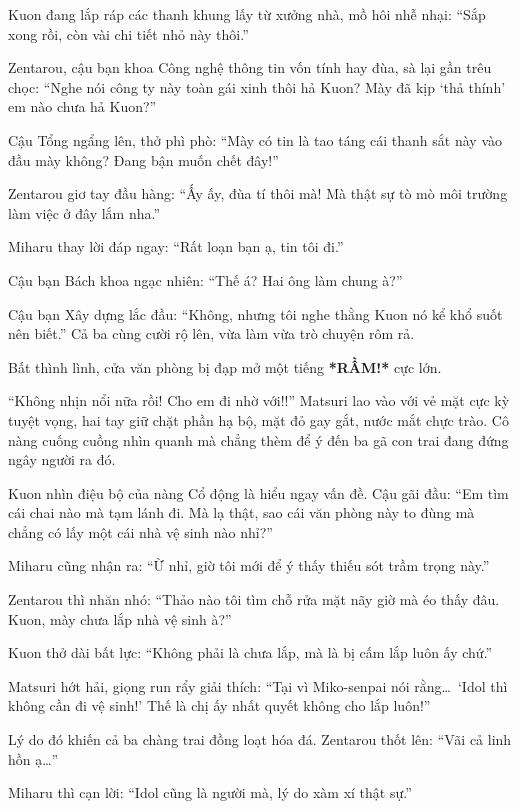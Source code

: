 \documentclass[../main.tex]{subfiles}
\begin{document}
Kuon đang lắp ráp các thanh khung lấy từ xưởng nhà, mồ hôi nhễ nhại: ``Sắp xong rồi, còn vài chi tiết nhỏ này thôi.''

Zentarou, cậu bạn khoa Công nghệ thông tin vốn tính hay đùa, sà lại gần trêu chọc: ``Nghe nói công ty này toàn gái xinh thôi hả Kuon? Mày đã kịp `thả thính' em nào chưa hả Kuon?''

Cậu Tổng ngẩng lên, thở phì phò: ``Mày có tin là tao táng cái thanh sắt này vào đầu mày không? Đang bận muốn chết đây!''

Zentarou giơ tay đầu hàng: ``Ấy ấy, đùa tí thôi mà! Mà thật sự tò mò môi trường làm việc ở đây lắm nha.''

Miharu thay lời đáp ngay: ``Rất loạn bạn ạ, tin tôi đi.''

Cậu bạn Bách khoa ngạc nhiên: ``Thế á? Hai ông làm chung à?''

Cậu bạn Xây dựng lắc đầu: ``Không, nhưng tôi nghe thằng Kuon nó kể khổ suốt nên biết.'' Cả ba cùng cười rộ lên, vừa làm vừa trò chuyện rôm rả.

Bất thình lình, cửa văn phòng bị đạp mở một tiếng \textbf{*RẦM!*} cực lớn.


``Không nhịn nổi nữa rồi! Cho em đi nhờ với!!'' Matsuri lao vào với vẻ mặt cực kỳ tuyệt vọng, hai tay giữ chặt phần hạ bộ, mặt đỏ gay gắt, nước mắt chực trào. Cô nàng cuống cuồng nhìn quanh mà chẳng thèm để ý đến ba gã con trai đang đứng ngây người ra đó.

Kuon nhìn điệu bộ của nàng Cổ động là hiểu ngay vấn đề. Cậu gãi đầu: ``Em tìm cái chai nào mà tạm lánh đi. Mà lạ thật, sao cái văn phòng này to đùng mà chẳng có lấy một cái nhà vệ sinh nào nhỉ?''

Miharu cũng nhận ra: ``Ừ nhỉ, giờ tôi mới để ý thấy thiếu sót trầm trọng này.''

Zentarou thì nhăn nhó: ``Thảo nào tôi tìm chỗ rửa mặt nãy giờ mà éo thấy đâu. Kuon, mày chưa lắp nhà vệ sinh à?''

Kuon thở dài bất lực: ``Không phải là chưa lắp, mà là bị cấm lắp luôn ấy chứ.''

Matsuri hớt hải, giọng run rẩy giải thích: ``Tại vì Miko-senpai nói rằng\dots\ `Idol thì không cần đi vệ sinh!' Thế là chị ấy nhất quyết không cho lắp luôn!''

Lý do đó khiến cả ba chàng trai đồng loạt hóa đá. Zentarou thốt lên: ``Vãi cả linh hồn ạ\dots''

Miharu thì cạn lời: ``Idol cũng là người mà, lý do xàm xí thật sự.''
\end{document}
